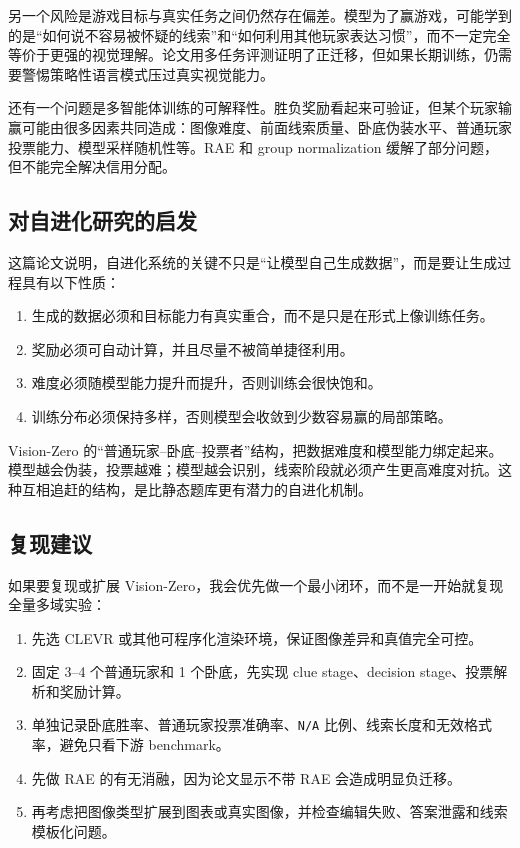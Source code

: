 另一个风险是游戏目标与真实任务之间仍然存在偏差。模型为了赢游戏，可能学到的是“如何说不容易被怀疑的线索”和“如何利用其他玩家表达习惯”，而不一定完全等价于更强的视觉理解。论文用多任务评测证明了正迁移，但如果长期训练，仍需要警惕策略性语言模式压过真实视觉能力。

还有一个问题是多智能体训练的可解释性。胜负奖励看起来可验证，但某个玩家输赢可能由很多因素共同造成：图像难度、前面线索质量、卧底伪装水平、普通玩家投票能力、模型采样随机性等。RAE 和 group normalization 缓解了部分问题，但不能完全解决信用分配。

\subsection{对自进化研究的启发}

这篇论文说明，自进化系统的关键不只是“让模型自己生成数据”，而是要让生成过程具有以下性质：

\begin{enumerate}
    \item 生成的数据必须和目标能力有真实重合，而不是只是在形式上像训练任务。
    \item 奖励必须可自动计算，并且尽量不被简单捷径利用。
    \item 难度必须随模型能力提升而提升，否则训练会很快饱和。
    \item 训练分布必须保持多样，否则模型会收敛到少数容易赢的局部策略。
\end{enumerate}

Vision-Zero 的“普通玩家--卧底--投票者”结构，把数据难度和模型能力绑定起来。模型越会伪装，投票越难；模型越会识别，线索阶段就必须产生更高难度对抗。这种互相追赶的结构，是比静态题库更有潜力的自进化机制。

\subsection{复现建议}

如果要复现或扩展 Vision-Zero，我会优先做一个最小闭环，而不是一开始就复现全量多域实验：

\begin{enumerate}
    \item 先选 CLEVR 或其他可程序化渲染环境，保证图像差异和真值完全可控。
    \item 固定 3--4 个普通玩家和 1 个卧底，先实现 clue stage、decision stage、投票解析和奖励计算。
    \item 单独记录卧底胜率、普通玩家投票准确率、\texttt{N/A} 比例、线索长度和无效格式率，避免只看下游 benchmark。
    \item 先做 RAE 的有无消融，因为论文显示不带 RAE 会造成明显负迁移。
    \item 再考虑把图像类型扩展到图表或真实图像，并检查编辑失败、答案泄露和线索模板化问题。
\end{enumerate}

